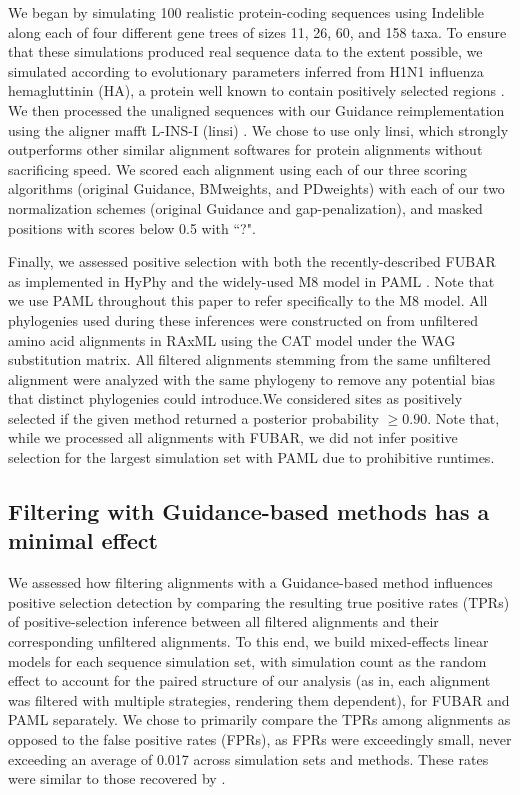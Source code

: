 \documentclass[10pt]{article}
\begin{document}
We began by simulating 100 realistic protein-coding sequences using Indelible \citep{Fletcher2009} along each of four different gene trees of sizes 11, 26, 60, and 158 taxa. To ensure that these simulations produced real sequence data to the extent possible, we simulated according to evolutionary parameters inferred from H1N1 influenza hemagluttinin (HA), a protein well known to contain positively selected regions \citep{Meyer2012}. We then processed the unaligned sequences with our Guidance reimplementation using the aligner mafft L-INS-I (linsi) \citep{Katoh2005}. We chose to use only linsi, which strongly outperforms other similar alignment softwares for protein alignments \citep{Thompson2011,Nuin2006} without sacrificing speed. We scored each alignment using each of our three scoring algorithms (original Guidance, BMweights, and PDweights) with each of our two normalization schemes (original Guidance and gap-penalization), and masked positions with scores below 0.5 with ``?".

Finally, we assessed positive selection with both the recently-described FUBAR \citep{Murrell2013} as implemented in HyPhy \citep{Pond2005} and the widely-used M8 model in PAML \citep{Yang2007}. Note that we use PAML throughout this paper to refer specifically to the M8 model.  All phylogenies used during these inferences were constructed on from unfiltered amino acid alignments in RAxML \citep{Stamatakis2006} using the CAT model under the WAG substitution matrix. All filtered alignments stemming from the same unfiltered alignment were analyzed with the same phylogeny to remove any potential bias that distinct phylogenies could introduce.We considered sites as positively selected if the given method returned a posterior probability $\geq0.90$. Note that, while we processed all alignments with FUBAR, we did not infer positive selection for the largest simulation set with PAML due to prohibitive runtimes. 


\subsection*{Filtering with Guidance-based methods has a minimal effect}

We assessed how filtering alignments with a Guidance-based method influences positive selection detection by comparing the resulting true positive rates (TPRs) of positive-selection inference between all filtered alignments and their corresponding unfiltered alignments. To this end, we build mixed-effects linear models for each sequence simulation set, with simulation count as the random effect to account for the paired structure of our analysis (as in, each alignment was filtered with multiple strategies, rendering them dependent), for FUBAR and PAML separately. We chose to primarily compare the TPRs among alignments as opposed to the false positive rates (FPRs), as FPRs were exceedingly small, never exceeding an average of 0.017 across simulation sets and methods. These rates were similar to those recovered by \citep{Jordan2012}. 
\end{document}
